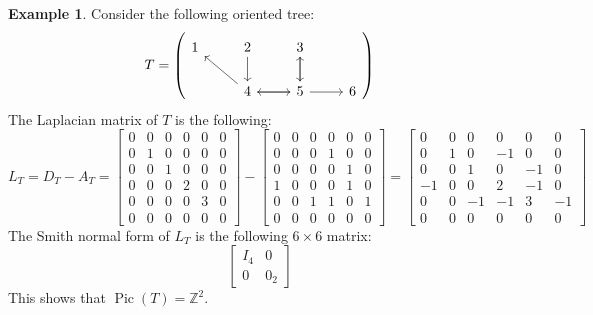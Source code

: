 \documentclass[11pt,reqno]{amsart}
\DeclareMathOperator{\Pic}{Pic}
\theoremstyle{definition}
\newtheorem{myeg}[mydef]{\textbf{Example}}
\theoremstyle{plain}
\begin{document}
\begin{myeg}\label{example: oriented tree}
Consider the following oriented tree:
\[
T=\left(\begin{tikzcd}
1
	& 2 \arrow[d,swap] &  3 \arrow[d] & \\
	& 4\arrow[r,swap] \arrow[ul] & 5 \arrow[l] \arrow[u]\arrow[r,swap] & 6
\end{tikzcd}\right)
\]
The Laplacian matrix of $T$ is the following:
\[
L_T = D_T - A_T = \begin{bmatrix}
0& 0& 0& 0& 0&0 \\
0& 1&0 & 0& 0&0 \\
0& 0& 1& 0& 0&0 \\
0&0 &0 &2 &0 & 0\\
0&0 &0 &0 &3 &0 \\
0& 0& 0& 0& 0&0
\end{bmatrix} - \begin{bmatrix}
0 & 0& 0& 0& 0& 0\\
0& 0& 0&1 &0 & 0\\
0&0 &0 &0 &1 &0 \\
1& 0& 0& 0&1 &0 \\
0& 0& 1&1 &0 &1 \\
0& 0& 0& 0& 0& 0
\end{bmatrix} = \begin{bmatrix}
0&0 &0 &0 &0 &0 \\
0&1 &0 &-1 &0 &0 \\
0& 0& 1&0 &-1 &0 \\
-1& 0& 0& 2&-1 &0 \\
0&0 &-1 &-1 &3 &-1 \\
0& 0&0 &0 &0 &0
\end{bmatrix}
\]
The Smith normal form of $L_T$ is the following $6\times 6$ matrix:
\[
\left[\begin{array}{c|c}
	I_4 & 0 \\ \hline
	0 & 0_2
\end{array}\right]
\]
This shows that $\Pic(T)=\mathbb{Z}^2$.
\end{myeg}
\end{document}
